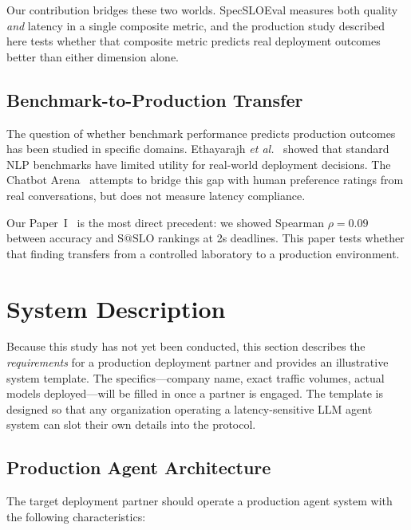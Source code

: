 \documentclass[11pt]{article}
\makeatletter
\newcommand{\sslo}{\ensuremath{\mathrm{S@SLO}}}
\newcommand{\etal}{\textit{et al.}}
\makeatother
\begin{document}
Our contribution bridges these two worlds. SpecSLOEval measures both quality \emph{and} latency in a single composite metric, and the production study described here tests whether that composite metric predicts real deployment outcomes better than either dimension alone.

\subsection{Benchmark-to-Production Transfer}

The question of whether benchmark performance predicts production outcomes has been studied in specific domains. Ethayarajh \etal~\cite{ethayarajh2020utility} showed that standard NLP benchmarks have limited utility for real-world deployment decisions. The Chatbot Arena~\cite{chiang2024chatbot} attempts to bridge this gap with human preference ratings from real conversations, but does not measure latency compliance.

Our Paper~I~\cite{maloney2025deploymentgap} is the most direct precedent: we showed Spearman $\rho = 0.09$ between accuracy and $\sslo{}$ rankings at 2s deadlines. This paper tests whether that finding transfers from a controlled laboratory to a production environment.

\section{System Description}
\label{sec:system}

Because this study has not yet been conducted, this section describes the \emph{requirements} for a production deployment partner and provides an illustrative system template. The specifics---company name, exact traffic volumes, actual models deployed---will be filled in once a partner is engaged. The template is designed so that any organization operating a latency-sensitive LLM agent system can slot their own details into the protocol.

\subsection{Production Agent Architecture}

The target deployment partner should operate a production agent system with the following characteristics:
\end{document}
